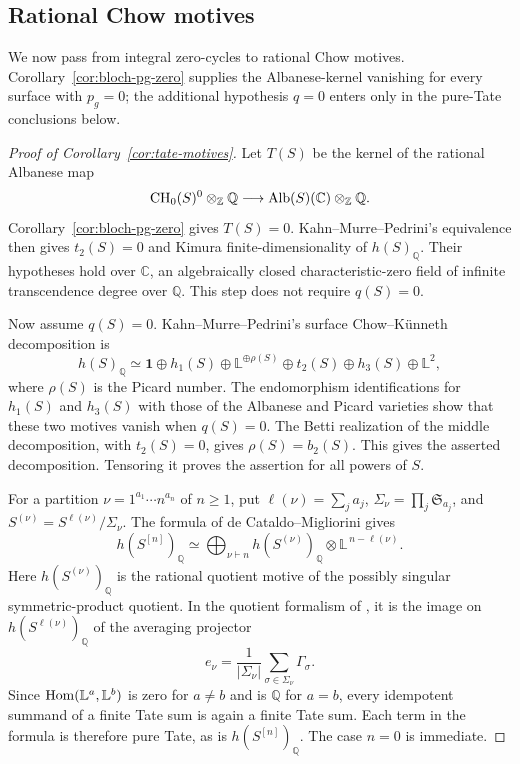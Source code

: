 \subsection{Rational Chow motives}\label{subsec:motivic-consequences}

We now pass from integral zero-cycles to rational Chow motives.
Corollary~\ref{cor:bloch-pg-zero} supplies the Albanese-kernel
vanishing for every surface with \(p_g=0\); the additional hypothesis
\(q=0\) enters only in the pure-Tate conclusions below.

\begin{proof}[Proof of Corollary~\ref{cor:tate-motives}]
Let \(T(S)\) be the kernel of the rational Albanese map
\[
\operatorname{CH}_0(S)^0\otimes_{\mathbb Z}\mathbb Q
\longrightarrow \operatorname{Alb}(S)(\mathbb C)\otimes_{\mathbb Z}\mathbb Q.
\]
Corollary~\ref{cor:bloch-pg-zero} gives \(T(S)=0\).
Kahn--Murre--Pedrini's equivalence
\cite[Corollaries~7.4.9 and~7.6.11]{KMP} then gives \(t_2(S)=0\)
and Kimura finite-dimensionality of \(h(S)_{\mathbb Q}\). Their
hypotheses hold over \(\mathbb C\), an algebraically closed
characteristic-zero field of infinite transcendence degree over
\(\mathbb Q\). This step does not require \(q(S)=0\).

Now assume \(q(S)=0\). Kahn--Murre--Pedrini's surface
Chow--K\"unneth decomposition
\cite[Propositions~7.2.1 and~7.2.3]{KMP} is
\[
h(S)_{\mathbb Q}\simeq
\mathbf 1\oplus h_1(S)\oplus\mathbb L^{\oplus\rho(S)}
\oplus t_2(S)\oplus h_3(S)\oplus\mathbb L^2,
\]
where \(\rho(S)\) is the Picard number. The endomorphism
identifications for \(h_1(S)\) and \(h_3(S)\) with those of the
Albanese and Picard varieties show that these two motives vanish when
\(q(S)=0\). The Betti realization of the middle decomposition, with
\(t_2(S)=0\), gives \(\rho(S)=b_2(S)\). This gives the asserted
decomposition. Tensoring it proves the assertion for all powers of
\(S\).

For a partition \(\nu=1^{a_1}\cdots n^{a_n}\) of \(n\ge1\), put
\(\ell(\nu)=\sum_j a_j\), \(\Sigma_\nu=\prod_j\mathfrak S_{a_j}\),
and \(S^{(\nu)}=S^{\ell(\nu)}/\Sigma_\nu\).
The formula of de Cataldo--Migliorini
\cite[Theorem~6.2.1]{deCataldoMigliorini} gives
\[
h(S^{[n]})_{\mathbb Q}\simeq
\bigoplus_{\nu\vdash n}h(S^{(\nu)})_{\mathbb Q}
 \otimes\mathbb L^{\,n-\ell(\nu)}.
\]
Here \(h(S^{(\nu)})_{\mathbb Q}\) is the rational quotient motive of
the possibly singular symmetric-product quotient. In the quotient
formalism of \cite[Section~4.3, Lemma~4.3.1, and Remark~5.4.5]{deCataldoMigliorini},
it is the image on \(h(S^{\ell(\nu)})_{\mathbb Q}\) of the averaging
projector
\[
e_\nu=\frac{1}{|\Sigma_\nu|}
\sum_{\sigma\in\Sigma_\nu}\Gamma_\sigma.
\]
Since \(\operatorname{Hom}(\mathbb L^a,\mathbb L^b)\) is zero for \(a\ne b\) and
is \(\mathbb Q\) for \(a=b\), every idempotent summand of a finite
Tate sum is again a finite Tate sum. Each term in the formula is
therefore pure Tate, as is \(h(S^{[n]})_{\mathbb Q}\). The case
\(n=0\) is immediate.


\end{proof}
